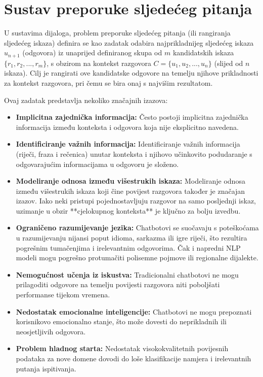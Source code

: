 \section{Sustav preporuke sljedećeg pitanja}
U sustavima dijaloga, problem preporuke sljedećeg pitanja (ili rangiranja sljedećeg iskaza) definira se kao zadatak odabira najprikladnijeg sljedećeg iskaza $u_{n+1}$ (odgovora) iz unaprijed definiranog skupa od $m$ kandidatskih iskaza $\{r_1, r_2,..., r_m\}$, s obzirom na kontekst razgovora $C = \{u_1, u_2,..., u_n\}$ (slijed od $n$ iskaza). Cilj je rangirati ove kandidatske odgovore na temelju njihove prikladnosti za kontekst razgovora, pri čemu se bira onaj s najvišim rezultatom.

Ovaj zadatak predstavlja nekoliko značajnih izazova:
\begin{itemize}
\item \textbf{Implicitna zajednička informacija:} Često postoji implicitna zajednička informacija između konteksta i odgovora koja nije eksplicitno navedena.
\item \textbf{Identificiranje važnih informacija:} Identificiranje važnih informacija (riječi, fraza i rečenica) unutar konteksta i njihovo učinkovito podudaranje s odgovarajućim informacijama u odgovoru je složeno.
\item \textbf{Modeliranje odnosa između višestrukih iskaza:} Modeliranje odnosa između višestrukih iskaza koji čine povijest razgovora također je značajan izazov. Iako neki pristupi pojednostavljuju razgovor na samo posljednji iskaz, uzimanje u obzir **cjelokupnog konteksta** je ključno za bolju izvedbu.
\item \textbf{Ograničeno razumijevanje jezika:} Chatbotovi se suočavaju s poteškoćama u razumijevanju nijansi poput idioma, sarkazma ili igre riječi, što rezultira pogrešnim tumačenjima i irelevantnim odgovorima. Čak i napredni NLP modeli mogu pogrešno protumačiti polisemne pojmove ili regionalne dijalekte.
\item \textbf{Nemogućnost učenja iz iskustva:} Tradicionalni chatbotovi ne mogu prilagoditi odgovore na temelju povijesti razgovora niti poboljšati performanse tijekom vremena.
\item \textbf{Nedostatak emocionalne inteligencije:} Chatbotovi ne mogu prepoznati korisnikovo emocionalno stanje, što može dovesti do neprikladnih ili neosjetljivih odgovora.
\item \textbf{Problem hladnog starta:} Nedostatak visokokvalitetnih povijesnih podataka za nove domene dovodi do loše klasifikacije namjera i irelevantnih putanja ispitivanja.

\end{itemize}
